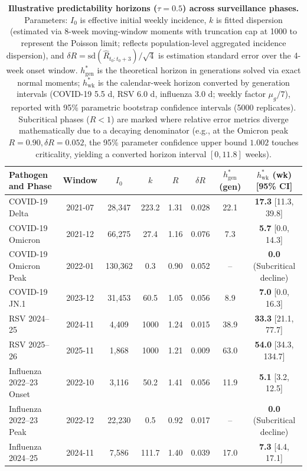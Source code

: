 \documentclass[review]{elsarticle}
\theoremstyle{plain}
\theoremstyle{definition}
\begin{document}
\begin{table}[htbp]
\centering
\caption{\textbf{Illustrative predictability horizons ($\tau=0.5$) across surveillance phases.} Parameters: $I_0$ is effective initial weekly incidence, $k$ is fitted dispersion (estimated via 8-week moving-window moments with truncation cap at 1000 to represent the Poisson limit; reflects population-level aggregated incidence dispersion), and $\delta R = \text{sd}(\hat{R}_{t_0:t_0+3})/\sqrt{4}$ is estimation standard error over the 4-week onset window. $h^*_{\text{gen}}$ is the theoretical horizon in generations solved via exact normal moments; $h^*_{\text{wk}}$ is the calendar-week horizon converted by generation intervals (COVID-19 5.5 d, RSV 6.0 d, influenza 3.0 d; weekly factor $\mu_g/7$), reported with 95\% parametric bootstrap confidence intervals (5000 replicates). Subcritical phases ($R<1$) are marked where relative error metrics diverge mathematically due to a decaying denominator (e.g., at the Omicron peak $R=0.90, \delta R=0.052$, the 95\% parameter confidence upper bound $1.002$ touches criticality, yielding a converted horizon interval $[0, 11.8]$ weeks).}
\label{tab:horizons}
\small
\begin{tabular}{@{}lccccccc@{}}
\toprule
\textbf{Pathogen and Phase} & \textbf{Window} & $I_0$ & $k$ & $R$ & $\delta R$ & $h^*_{\text{gen}}$ (gen) & $h^*_{\text{wk}}$ (wk) [95\% CI] \\
\midrule
COVID-19 Delta & 2021-07 & 28,347 & 223.2 & 1.31 & 0.028 & 22.1 & \textbf{17.3} [11.3, 39.8] \\
COVID-19 Omicron & 2021-12 & 66,275 & 27.4 & 1.16 & 0.076 & 7.3 & \textbf{5.7} [0.0, 14.3] \\
COVID-19 Omicron Peak & 2022-01 & 130,362 & 0.3 & 0.90 & 0.052 & -- & \textbf{0.0} (Subcritical decline) \\
COVID-19 JN.1 & 2023-12 & 31,453 & 60.5 & 1.05 & 0.056 & 8.9 & \textbf{7.0} [0.0, 16.3] \\
RSV 2024--25 & 2024-11 & 4,409 & 1000 & 1.24 & 0.015 & 38.9 & \textbf{33.3} [21.1, 77.7] \\
RSV 2025--26 & 2025-11 & 1,868 & 1000 & 1.21 & 0.009 & 63.0 & \textbf{54.0} [34.3, 134.7] \\
Influenza 2022--23 Onset & 2022-10 & 3,116 & 50.2 & 1.41 & 0.056 & 11.9 & \textbf{5.1} [3.2, 12.5] \\
Influenza 2022--23 Peak & 2022-12 & 22,230 & 0.5 & 0.92 & 0.017 & -- & \textbf{0.0} (Subcritical decline) \\
Influenza 2024--25 & 2024-11 & 7,586 & 111.7 & 1.40 & 0.039 & 17.0 & \textbf{7.3} [4.4, 17.1] \\
\bottomrule
\end{tabular}
\end{table}
\end{document}

